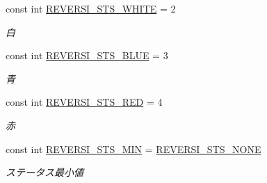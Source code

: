 \begin{DoxyCompactItemize}
\mbox{\label{class_reversi4color_form_1_1_reversi_const_aa2d5ad39534913e283d839343cf9731e}} 
const int \hyperlink{class_reversi4color_form_1_1_reversi_const_aa2d5ad39534913e283d839343cf9731e}{R\+E\+V\+E\+R\+S\+I\+\_\+\+S\+T\+S\+\_\+\+W\+H\+I\+TE} = 2
\begin{DoxyCompactList}\small\item\em 白 \end{DoxyCompactList}\item 
\mbox{\label{class_reversi4color_form_1_1_reversi_const_a6a2d24b02a48fef44f3da50413345cc7}} 
const int \hyperlink{class_reversi4color_form_1_1_reversi_const_a6a2d24b02a48fef44f3da50413345cc7}{R\+E\+V\+E\+R\+S\+I\+\_\+\+S\+T\+S\+\_\+\+B\+L\+UE} = 3
\begin{DoxyCompactList}\small\item\em 青 \end{DoxyCompactList}\item 
\mbox{\label{class_reversi4color_form_1_1_reversi_const_a9bc111d617eb22b61432f788a6663f67}} 
const int \hyperlink{class_reversi4color_form_1_1_reversi_const_a9bc111d617eb22b61432f788a6663f67}{R\+E\+V\+E\+R\+S\+I\+\_\+\+S\+T\+S\+\_\+\+R\+ED} = 4
\begin{DoxyCompactList}\small\item\em 赤 \end{DoxyCompactList}\item 
\mbox{\label{class_reversi4color_form_1_1_reversi_const_a0ec9af611211a194945e7cacbbe4b970}} 
const int \hyperlink{class_reversi4color_form_1_1_reversi_const_a0ec9af611211a194945e7cacbbe4b970}{R\+E\+V\+E\+R\+S\+I\+\_\+\+S\+T\+S\+\_\+\+M\+IN} = \hyperlink{class_reversi4color_form_1_1_reversi_const_a8e61d2e07abac47686be72a7b936d8d2}{R\+E\+V\+E\+R\+S\+I\+\_\+\+S\+T\+S\+\_\+\+N\+O\+NE}
\begin{DoxyCompactList}\small\item\em ステータス最小値 \end{DoxyCompactList}\item 
\mbox{\label{class_reversi4color_form_1_1_reversi_const_a63d01450a60c1ba322c9bd3463470751}} 

\end{DoxyCompactItemize}
